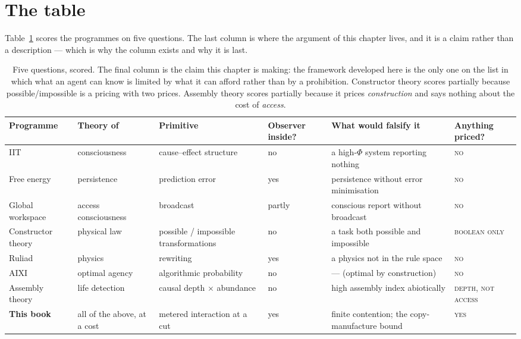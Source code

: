 \section*{The table}

Table~\ref{tab:related} scores the programmes on five questions.
The last column is where the argument of this chapter lives, and it
is a claim rather than a description --- which is why the column
exists and why it is last.

\begin{table}[htbp]
\centering
\small
\renewcommand{\arraystretch}{1.35}
\begin{tabular}{@{}p{2.1cm} p{2.3cm} p{2.2cm} p{1.5cm} p{2.4cm} p{1.6cm}@{}}
\toprule
\textbf{Programme} & \textbf{Theory of} & \textbf{Primitive} &
\textbf{Observer inside?} & \textbf{What would falsify it} &
\textbf{Anything priced?} \\
\midrule
IIT & consciousness & cause--effect structure & no &
a high-$\Phi$ system reporting nothing & \textsc{no} \\
Free energy & persistence & prediction error & yes &
persistence without error minimisation & \textsc{no} \\
Global workspace & access consciousness & broadcast &
partly & conscious report without broadcast & \textsc{no} \\
Constructor theory & physical law & possible / impossible
transformations & no & a task both possible and impossible &
\textsc{boolean only} \\
Ruliad & physics & rewriting & yes & a physics not in the rule
space & \textsc{no} \\
AIXI & optimal agency & algorithmic probability & no &
--- (optimal by construction) & \textsc{no} \\
Assembly theory & life detection & causal depth $\times$
abundance & no & high assembly index abiotically &
\textsc{depth, not access} \\
\midrule
\textbf{This book} & all of the above, at a cost &
metered interaction at a cut & yes &
finite contention; the copy-manufacture bound &
\textsc{yes} \\
\bottomrule
\end{tabular}
\caption{Five questions, scored. The final column is the claim this
chapter is making: the framework developed here is the only one on
the list in which what an agent can know is limited by what it can
afford rather than by a prohibition. Constructor theory scores
partially because possible/impossible is a pricing with two prices.
Assembly theory scores partially because it prices \emph{construction}
and says nothing about the cost of \emph{access}.}
\label{tab:related}
\end{table}

